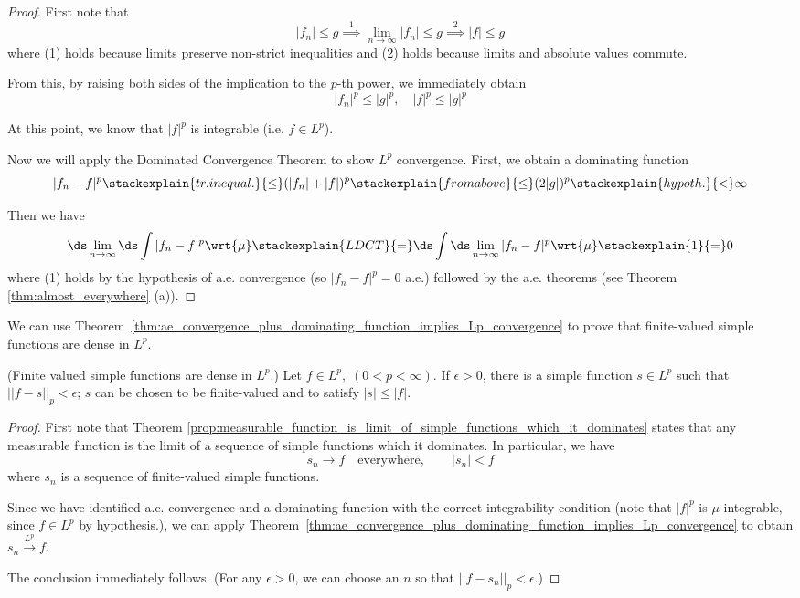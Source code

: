 \documentclass{article} %
\newcommand{\dlim}{\ds\lim}
\newcommand{\dint}{\ds\int}
\newcommand{\dmu}{\wrt{\mu}}
\newcommand{\convergenceInLp}{\stackrel{L^p}{\to}}
\begin{document}
\begin{proof}
First note that
\[ |f_n| \leq g \stackrel{1}{\implies} \lim_{n \to \infty } |f_n| \leq g \stackrel{2}{\implies} |f| \leq g\]
where (1) holds because limits preserve non-strict inequalities and (2) holds because limits and absolute values commute. 

From this, by raising both sides of the implication to the $p$-th power, we immediately obtain
\[ |f_n|^p \leq |g|^p, \quad |f|^p \leq |g|^p \]	

At this point, we know that $|f|^p$ is integrable (i.e. $f \in L^p$). 

Now we will apply the Dominated Convergence Theorem to show $L^p$ convergence.  First, we obtain a dominating function
\[ |f_n -f|^p \stackexplain{tr. inequal.}{\leq} (|f_n| + |f|)^p \stackexplain{from above}{\leq} (2 |g|)^p \stackexplain{hypoth.}{<} \infty\]

Then we have
%
\[ \dlim_{n \to \infty} \dint |f_n - f|^p \dmu \stackexplain{LDCT}{=} \dint \dlim_{n \to \infty}  |f_n - f|^p \dmu \stackexplain{1}{=}   0 \]
where (1) holds by the hypothesis of a.e. convergence (so $|f_n - f|^p =0$ a.e.) followed by the a.e. theorems (see Theorem \ref{thm:almost_everywhere} (a)). 
\end{proof}


We can use Theorem~\ref{thm:ae_convergence_plus_dominating_function_implies_Lp_convergence} to prove that finite-valued simple functions are dense in $L^p$.

\begin{theorem}\textnormal{(Finite valued simple functions are dense in $L^p$.)}
Let $f \in L^p, \; (0 < p < \infty)$. If $\epsilon >0$, there is a simple function $s \in L^p$ such that $||f-s||_p < \epsilon$; $s$ can be chosen to be finite-valued and to satisfy $|s| \leq |f|$.
\label{thm:finite_valued_simple_functions_are_dense_in_Lp}	
\end{theorem}

\begin{proof}
First note that Theorem \ref{prop:measurable_function_is_limit_of_simple_functions_which_it_dominates} states that any measurable function  is the limit of a sequence of simple functions which it dominates.   In particular, we have
\[s_n \to f \quad \text{everywhere}, \quad\quad |s_n| < f \]
where $s_n$ is a sequence of finite-valued simple functions.

Since we have identified a.e. convergence and a dominating function with the correct integrability condition {\tiny (note that $|f|^p$ is $\mu$-integrable, since $f \in L^p$ by hypothesis.)}, we can apply Theorem~\ref{thm:ae_convergence_plus_dominating_function_implies_Lp_convergence} to obtain  $s_n \convergenceInLp f$.   

The conclusion immediately follows. {\tiny (For any $\epsilon>0$, we can choose an $n$ so that $||f-s_n||_p < \epsilon$.)}
 

\end{proof}
\end{document}
